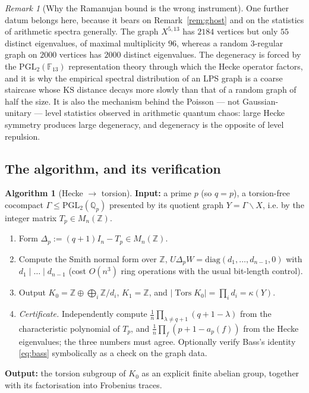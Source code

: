 \documentclass[11pt]{amsart}
\numberwithin{equation}{section}
\theoremstyle{definition}
\newtheorem{algorithm}[theorem]{Algorithm}
\theoremstyle{remark}
\newtheorem{remark}[theorem]{Remark}
\newcommand{\Z}{\mathbb{Z}}
\newcommand{\Q}{\mathbb{Q}}
\newcommand{\F}{\mathbb{F}}
\newcommand{\Tors}{\operatorname{Tors}}
\newcommand{\PGL}{\mathrm{PGL}}
\begin{document}
\begin{remark}[Why the Ramanujan bound is the wrong instrument]
One further datum belongs here, because it bears on Remark~\ref{rem:ghost} and on the
statistics of arithmetic spectra generally. The graph $X^{5,13}$ has $2184$ vertices but
only $55$ distinct eigenvalues, of maximal multiplicity $96$, whereas a random
$3$-regular graph on $2000$ vertices has $2000$ distinct eigenvalues. The degeneracy is
forced by the $\mathrm{PGL}_2(\F_{13})$ representation theory through which the Hecke
operator factors, and it is why the empirical spectral distribution of an LPS graph is a
coarse staircase whose $\mathrm{KS}$ distance decays more slowly than that of a random
graph of half the size. It is also the mechanism behind the Poisson --- not
Gaussian-unitary --- level statistics observed in arithmetic quantum chaos: large Hecke
symmetry produces large degeneracy, and degeneracy is the opposite of level repulsion.
\end{remark}

\subsection{The algorithm, and its verification}

\begin{algorithm}[Hecke $\to$ torsion]\label{alg:main}
\textbf{Input:} a prime $p$ (so $q=p$), a torsion-free cocompact $\Gamma\le\PGL_2(\Q_p)$
presented by its quotient graph $Y=\Gamma\backslash X$, i.e. by the integer matrix
$T_p\in M_n(\Z)$.
\begin{enumerate}
\item[(1)] Form $\Delta_p:=(q+1)I_n-T_p\in M_n(\Z)$.
\item[(2)] Compute the Smith normal form over $\Z$,
$U\Delta_pW=\mathrm{diag}(d_1,\dots,d_{n-1},0)$ with $d_1\mid\dots\mid d_{n-1}$
(cost $O(n^3)$ ring operations with the usual bit-length control).
\item[(3)] Output $K_0=\Z\oplus\bigoplus_i\Z/d_i$, $K_1=\Z$, and
$|\Tors K_0|=\prod_id_i=\kappa(Y)$.
\item[(4)] \emph{Certificate.} Independently compute
$\frac1n\prod_{\lambda\neq q+1}(q+1-\lambda)$ from the characteristic polynomial of
$T_p$, and $\frac1n\prod_f(p+1-a_p(f))$ from the Hecke eigenvalues; the three numbers
must agree. Optionally verify Bass's identity \eqref{eq:bass} symbolically as a check on
the graph data.
\end{enumerate}
\textbf{Output:} the torsion subgroup of $K_0$ as an explicit finite abelian group,
together with its factorisation into Frobenius traces.
\end{algorithm}
\end{document}

